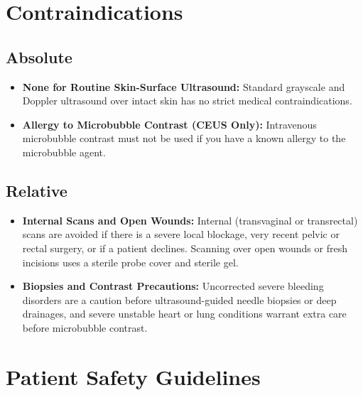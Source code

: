\section{Contraindications}

\subsection{Absolute}

\begin{itemize}
    \item \textbf{None for Routine Skin-Surface Ultrasound:} Standard grayscale and Doppler ultrasound over intact skin has no strict medical contraindications.
    \item \textbf{Allergy to Microbubble Contrast (CEUS Only):} Intravenous microbubble contrast must not be used if you have a known allergy to the microbubble agent.
\end{itemize}

\subsection{Relative}

\begin{itemize}
    \item \textbf{Internal Scans and Open Wounds:} Internal (transvaginal or transrectal) scans are avoided if there is a severe local blockage, very recent pelvic or rectal surgery, or if a patient declines. Scanning over open wounds or fresh incisions uses a sterile probe cover and sterile gel.
    \item \textbf{Biopsies and Contrast Precautions:} Uncorrected severe bleeding disorders are a caution before ultrasound-guided needle biopsies or deep drainages, and severe unstable heart or lung conditions warrant extra care before microbubble contrast.
\end{itemize}

\section{Patient Safety Guidelines}

